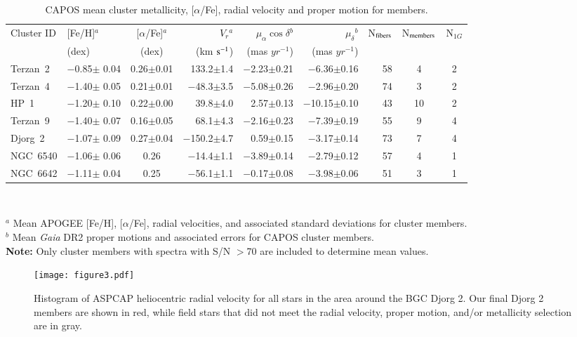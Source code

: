 \documentclass[onecolumn]{aa}
\begin{document}
\begin{table*}
	\begin{center}
		\setlength{\tabcolsep}{2.mm}  
		\caption{CAPOS mean cluster metallicity, [$\alpha$/Fe], radial velocity and proper motion for members.}
		\begin{tabular}{llcrrrrcc}
			\hline
			Cluster ID & [Fe/H]$^a$ & [$\alpha$/Fe]$^{a}$ & $V_{r}$$^{a}$ & $\mu _{\alpha} \cos\delta$$^{b}$& $\mu _{\delta}$$^{b}$& N$_{\rm {fibers}}$ & N$_{\rm members}$ & N$_{1G}$  \\
& (dex) & (dex) & (km $\rm s^{-1}$) & (mas $yr^{-1}$) & (mas $yr^{-1}$) & &  &   \\
			\hline
  Terzan~2 &  $-$0.85$\pm${ 0.04} & 0.26$\pm$0.01 & 133.2$\pm$1.4 & $-$2.23$\pm$0.21 &$-$6.36$\pm$0.16  & { 58} & 4 & 2 \\
Terzan~4 & $-$1.40$\pm${ 0.05} & 0.21$\pm$0.01 & $-$48.3$\pm$3.5 & $-$5.08$\pm$0.26 & $-$2.96$\pm$0.20 & { 74} & 3 & 2 \\
HP~1 &  $-$1.20$\pm${ 0.10} & 0.22$\pm$0.00 & 39.8$\pm$4.0 & 2.57$\pm$0.13 & $-$10.15$\pm$0.10 & { 43} & 10 & 2 \\
Terzan~9 & $-$1.40$\pm${ 0.07} & 0.16$\pm$0.05 & 68.1$\pm$4.3 & $-$2.16$\pm$0.23 & $-$7.39$\pm$0.19 & { 55} & 9 & 4 \\
Djorg~2 &  $-$1.07$\pm${ 0.09} & 0.27$\pm$0.04 & $-$150.2$\pm$4.7 & 0.59$\pm$0.15 & $-$3.17$\pm$0.14 & { 73} & 7 & 4 \\
NGC~6540 & $-$1.06$\pm${ 0.06} & 0.26 & $-$14.4$\pm$1.1 & $-$3.89$\pm$0.14 & $-$2.79$\pm$0.12& { 57} & 4 & 1 \\
NGC~6642 &  $-$1.11$\pm${ 0.04} & 0.25 & $-$56.1$\pm$1.1 & $-$0.17$\pm$0.08 &$-$3.98$\pm$0.06 & { 51} & 3 & 1 \\			
\hline
		\end{tabular}  \label{meanvalues}\\
	\end{center}
	\raggedright{
		$^{a}$ Mean APOGEE [Fe/H], [$\alpha$/Fe], radial velocities, and associated standard deviations for cluster members.\\
		$^{b}$ Mean {\it Gaia} DR2 proper motions and associated errors for CAPOS cluster members.\\
		{\bf Note:} Only cluster members with spectra with S/N $>$70 are included to determine mean values.}
\end{table*}




\begin{figure*}
\centering

   \texttt{[image: figure3.pdf]}
      \caption{Histogram of ASPCAP heliocentric radial velocity for all stars in the area around the BGC Djorg 2. Our final Djorg 2 members are shown in red, while field stars that did not meet the radial velocity, proper motion, and/or metallicity selection are in gray. }
    \label{membership1}
\end{figure*}
\end{document}
